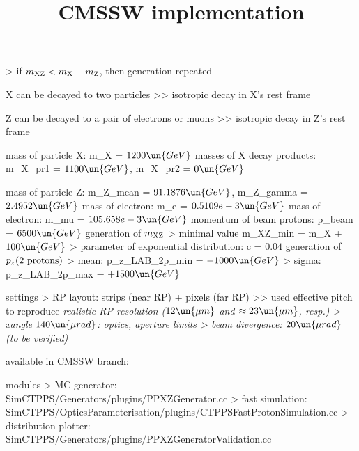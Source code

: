 \>> if $m_{\rm XZ} < m_{\rm X} + m_{\rm Z}$, then generation repeated

\> X can be decayed to two particles
\>>> isotropic decay in X's rest frame

\> Z can be decayed to a pair of electrons or muons
\>>> isotropic decay in Z's rest frame


\newpage %

\SmallerFonts

\> mass of particle X: m\_X = $1200\un{GeV}$
\> masses of X decay products: m\_X\_pr1 = $1100\un{GeV}$, m\_X\_pr2 = $0\un{GeV}$

\> mass of particle Z: m\_Z\_mean = $91.1876\un{GeV}$, m\_Z\_gamma = $2.4952\un{GeV}$
\> mass of electron: m\_e = $0.5109e-3\un{GeV}$
\> mass of electron: m\_mu = $105.658e-3\un{GeV}$
\> momentum of beam protons: p\_beam = $6500\un{GeV}$
\> generation of $m_{\rm XZ}$
\>> minimal value m\_XZ\_min = m\_X + $100\un{GeV}$
\>> parameter of exponential distribution: c = $0.04$
\> generation of $p_z(\hbox{2 protons})$
\>> mean: p\_z\_LAB\_2p\_min = $-1000\un{GeV}$
\>> sigma: p\_z\_LAB\_2p\_max = $+1500\un{GeV}$

 settings
\>> RP layout: strips (near RP) + pixels (far RP)
\>>> used effective pitch to reproduce \em{realistic RP resolution} ($12\un{\mu m}$ and $\approx 23\un{\mu m}$, resp.)
\>> xangle $140\un{\mu rad}$: optics, aperture limits
\>> beam divergence: $20\un{\mu rad}$ (\em{to be verified})


\newpage %
\title{CMSSW implementation}

\> available in CMSSW branch:\\ 

\NormalFonts

\> modules
\>> MC generator:\\ SimCTPPS/Generators/plugins/PPXZGenerator.cc
\>> fast simulation:\\ SimCTPPS/OpticsParameterisation/plugins/CTPPSFastProtonSimulation.cc
\>> distribution plotter:\\ SimCTPPS/Generators/plugins/PPXZGeneratorValidation.cc

